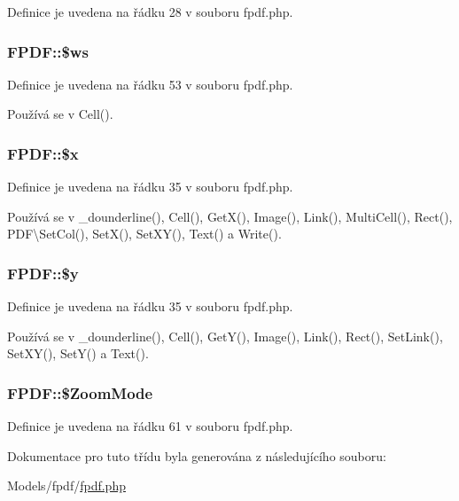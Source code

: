 Definice je uvedena na řádku 28 v souboru fpdf.\-php.

\hypertarget{class_f_p_d_f_a05ee8f35c8f7e1d15680d28bb40eddf6}{
\subsubsection[{\$ws}]{\setlength{\rightskip}{0pt plus 5cm}F\-P\-D\-F\-::\$ws}}\label{class_f_p_d_f_a05ee8f35c8f7e1d15680d28bb40eddf6}


Definice je uvedena na řádku 53 v souboru fpdf.\-php.



Používá se v Cell().

\hypertarget{class_f_p_d_f_a84095b43bfc305f0b52c02075cb8674c}{
\subsubsection[{\$x}]{\setlength{\rightskip}{0pt plus 5cm}F\-P\-D\-F\-::\$x}}\label{class_f_p_d_f_a84095b43bfc305f0b52c02075cb8674c}


Definice je uvedena na řádku 35 v souboru fpdf.\-php.



Používá se v \-\_\-dounderline(), Cell(), Get\-X(), Image(), Link(), Multi\-Cell(), Rect(), P\-D\-F\textbackslash{}\-Set\-Col(), Set\-X(), Set\-X\-Y(), Text() a Write().

\hypertarget{class_f_p_d_f_a9183f42c12c75728174c0e36aefc3144}{
\subsubsection[{\$y}]{\setlength{\rightskip}{0pt plus 5cm}F\-P\-D\-F\-::\$y}}\label{class_f_p_d_f_a9183f42c12c75728174c0e36aefc3144}


Definice je uvedena na řádku 35 v souboru fpdf.\-php.



Používá se v \-\_\-dounderline(), Cell(), Get\-Y(), Image(), Link(), Rect(), Set\-Link(), Set\-X\-Y(), Set\-Y() a Text().

\hypertarget{class_f_p_d_f_afc97ebf2f645908e261c641fbf48be92}{
\subsubsection[{\$\-Zoom\-Mode}]{\setlength{\rightskip}{0pt plus 5cm}F\-P\-D\-F\-::\$\-Zoom\-Mode}}\label{class_f_p_d_f_afc97ebf2f645908e261c641fbf48be92}


Definice je uvedena na řádku 61 v souboru fpdf.\-php.



Dokumentace pro tuto třídu byla generována z následujícího souboru\-:\begin{DoxyCompactItemize}
\item 
Models/fpdf/\hyperlink{fpdf_8php}{fpdf.\-php}\end{DoxyCompactItemize}
